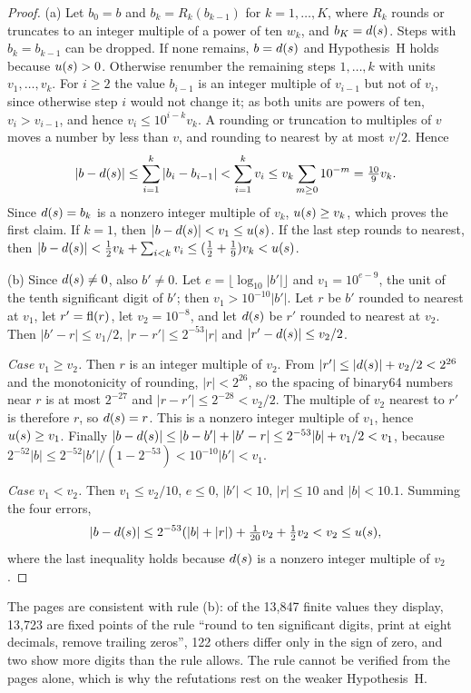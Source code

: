 \begin{proof}
(a) Let $b_0=b$ and $b_k=R_k(b_{k-1})$ for $k=1,\dots,K$, where $R_k$ rounds or truncates to an integer multiple of a power of ten $w_k$, and $b_K=d(s)$.
Steps with $b_k=b_{k-1}$ can be dropped.
If none remains, $b=d(s)$ and Hypothesis~H holds because $u(s)>0$.
Otherwise renumber the remaining steps $1,\dots,k$ with units $v_1,\dots,v_k$.
For $i\ge2$ the value $b_{i-1}$ is an integer multiple of $v_{i-1}$ but not of $v_i$, since otherwise step $i$ would not change it; as both units are powers of ten, $v_i>v_{i-1}$, and hence $v_i\le10^{i-k}v_k$.
A rounding or truncation to multiples of $v$ moves a number by less than $v$, and rounding to nearest by at most $v/2$.
Hence
\[
  |b-d(s)|\le\sum_{i=1}^{k}|b_i-b_{i-1}|<\sum_{i=1}^{k}v_i\le v_k\sum_{m\ge0}10^{-m}=\tfrac{10}{9}v_k .
\]
Since $d(s)=b_k$ is a nonzero integer multiple of $v_k$, $u(s)\ge v_k$, which proves the first claim.
If $k=1$, then $|b-d(s)|<v_1\le u(s)$.
If the last step rounds to nearest, then $|b-d(s)|<\tfrac12v_k+\sum_{i<k}v_i\le(\tfrac12+\tfrac19)v_k<u(s)$.

(b) Since $d(s)\ne0$, also $b'\ne0$.
Let $e=\lfloor\log_{10}|b'|\rfloor$ and $v_1=10^{e-9}$, the unit of the tenth significant digit of $b'$; then $v_1>10^{-10}|b'|$.
Let $r$ be $b'$ rounded to nearest at $v_1$, let $r'=\operatorname{fl}(r)$, let $v_2=10^{-8}$, and let $d(s)$ be $r'$ rounded to nearest at $v_2$.
Then $|b'-r|\le v_1/2$, $|r-r'|\le2^{-53}|r|$ and $|r'-d(s)|\le v_2/2$.

\emph{Case $v_1\ge v_2$.}
Then $r$ is an integer multiple of $v_2$.
From $|r'|\le|d(s)|+v_2/2<2^{26}$ and the monotonicity of rounding, $|r|<2^{26}$, so the spacing of binary64 numbers near $r$ is at most $2^{-27}$ and $|r-r'|\le2^{-28}<v_2/2$.
The multiple of $v_2$ nearest to $r'$ is therefore $r$, so $d(s)=r$.
This is a nonzero integer multiple of $v_1$, hence $u(s)\ge v_1$.
Finally $|b-d(s)|\le|b-b'|+|b'-r|\le2^{-53}|b|+v_1/2<v_1$, because $2^{-52}|b|\le2^{-52}|b'|/(1-2^{-53})<10^{-10}|b'|<v_1$.

\emph{Case $v_1<v_2$.}
Then $v_1\le v_2/10$, $e\le0$, $|b'|<10$, $|r|\le10$ and $|b|<10.1$.
Summing the four errors,
\[
  |b-d(s)|\le2^{-53}(|b|+|r|)+\tfrac{1}{20}v_2+\tfrac12v_2<v_2\le u(s),
\]
where the last inequality holds because $d(s)$ is a nonzero integer multiple of $v_2$.
\end{proof}

The pages are consistent with rule (b): of the 13,847 finite values they display, 13,723 are fixed points of the rule ``round to ten significant digits, print at eight decimals, remove trailing zeros'', 122 others differ only in the sign of zero, and two show more digits than the rule allows.
The rule cannot be verified from the pages alone, which is why the refutations rest on the weaker Hypothesis~H.

